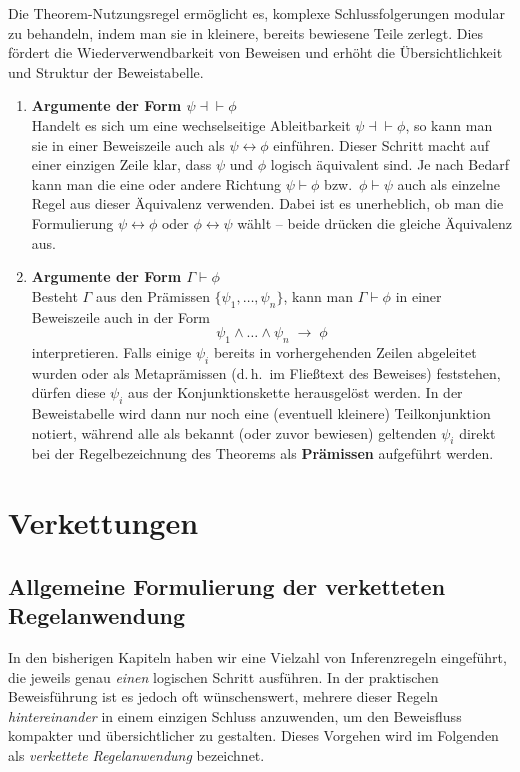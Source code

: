 \documentclass[main.tex]{subfiles}
\begin{document}
\begin{remark}
Die Theorem-Nutzungsregel ermöglicht es, komplexe Schlussfolgerungen modular zu behandeln, indem man sie in kleinere, bereits bewiesene Teile zerlegt. Dies fördert die Wiederverwendbarkeit von Beweisen und erhöht die Übersichtlichkeit und Struktur der Beweistabelle.
\end{remark}


\begin{remark}
\quad
\begin{enumerate}
    \item \textbf{Argumente der Form \(\psi \dashv\vdash \phi\)}\\
    Handelt es sich um eine wechselseitige Ableitbarkeit \(\psi \dashv\vdash \phi\), so kann man sie in einer Beweiszeile auch als \(\psi \leftrightarrow \phi\) einführen. Dieser Schritt macht auf einer einzigen Zeile klar, dass \(\psi\) und \(\phi\) logisch äquivalent sind. Je nach Bedarf kann man die eine oder andere Richtung \(\psi \vdash \phi\) bzw.\ \(\phi \vdash \psi\) auch als einzelne Regel aus dieser Äquivalenz verwenden.  Dabei ist es unerheblich, ob man die Formulierung \(\psi \leftrightarrow \phi\) oder \(\phi \leftrightarrow \psi\) wählt – beide drücken die gleiche Äquivalenz aus.

    \item \textbf{Argumente der Form \(\Gamma \vdash \phi\)}\\
    Besteht \(\Gamma\) aus den Prämissen \(\{\psi_1,\ldots,\psi_n\}\), kann man \(\Gamma \vdash \phi\) in einer Beweiszeile auch in der Form 
    \[
    \psi_1 \land \dots \land \psi_n \;\rightarrow\;\phi
    \]
    interpretieren.  
    Falls einige \(\psi_i\) bereits in vorhergehenden Zeilen abgeleitet wurden oder als Metaprämissen (d.\,h.\ im Fließtext des Beweises) feststehen, dürfen diese \(\psi_i\) aus der Konjunktionskette herausgelöst werden. In der Beweistabelle wird dann nur noch eine (eventuell kleinere) Teilkonjunktion notiert, während alle als bekannt (oder zuvor bewiesen) geltenden \(\psi_i\) direkt bei der Regelbezeichnung des Theorems als \textbf{Prämissen} aufgeführt werden.
\end{enumerate}
\end{remark}

\section{Verkettungen}

\subsection{Allgemeine Formulierung der verketteten Regelanwendung}
In den bisherigen Kapiteln haben wir eine Vielzahl von Inferenzregeln eingeführt, die jeweils genau \emph{einen} logischen Schritt ausführen. In der praktischen Beweisführung ist es jedoch oft wünschenswert, mehrere dieser Regeln \emph{hintereinander} in einem einzigen Schluss anzuwenden, um den Beweisfluss kompakter und übersichtlicher zu gestalten. Dieses Vorgehen wird im Folgenden als \emph{verkettete Regelanwendung} bezeichnet.
\end{document}
